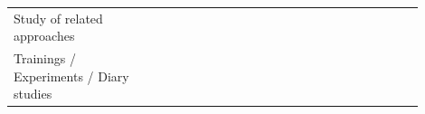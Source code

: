 \documentclass[english, 12pt, a4paper, sci, utf8, a-1b, online]{aaltothesis}
\begin{document}
{\begin{center}
\begin{longtable}{p{0.3\linewidth}p{0.6\linewidth}}
      Study of related approaches                  & \textcite{fagerholm-dx-concept-and-definition} \newline \textcite{henriques2018improving}                                                                                                                                                                                                                                                                                                                                                                                                                                                                                                                                                                                                                                                                                                                                                                                                                                                          \\
      Trainings / Experiments / Diary studies      & \textcite{nebeling2013informing} \newline \textcite{fontao2018mobile} \newline \textcite{dong2019impact} \newline \textcite{miranda2018improving} \newline \textcite{fontao2016mseco} \newline \textcite{ivo2018approach} \newline \textcite{de2017towards} \newline \textcite{nazariodetecting} \newline \textcite{zhang2018toward} \newline \textcite{silva-comparing}                                                                                                                                                                                                                                                                                                                                                                                                                                                                                                                                                                           \\

\end{longtable}
\end{center}}
\end{document}

